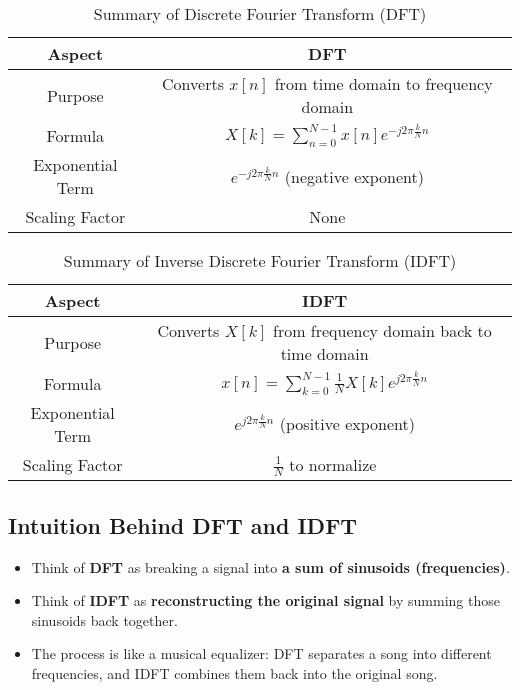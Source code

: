 \documentclass[12pt, letterpaper]{article}
\begin{document}
\begin{table}[h]
    \centering
    \begin{tabular}{|c|c|}
        \hline
        \textbf{Aspect} & \textbf{DFT} \\
        \hline
        Purpose & Converts \( x[n] \) from time domain to frequency domain \\
        \hline
        Formula & \( X[k] = \sum_{n=0}^{N-1} x[n] e^{-j 2\pi \frac{k}{N} n} \) \\
        \hline
        Exponential Term & \( e^{-j 2\pi \frac{k}{N} n} \) (negative exponent) \\
        \hline
        Scaling Factor & None \\
        \hline
    \end{tabular}
    \caption{Summary of Discrete Fourier Transform (DFT)}
\end{table}

\begin{table}[h]
    \centering
    \begin{tabular}{|c|c|}
        \hline
        \textbf{Aspect} & \textbf{IDFT} \\
        \hline
        Purpose & Converts \( X[k] \) from frequency domain back to time domain \\
        \hline
        Formula & \( x[n] = \sum_{k=0}^{N-1} \frac{1}{N} X[k] e^{j 2\pi \frac{k}{N} n} \) \\
        \hline
        Exponential Term & \( e^{j 2\pi \frac{k}{N} n} \) (positive exponent) \\
        \hline
        Scaling Factor & \( \frac{1}{N} \) to normalize \\
        \hline
    \end{tabular}
    \caption{Summary of Inverse Discrete Fourier Transform (IDFT)}
\end{table}

\FloatBarrier
\subsection{Intuition Behind DFT and IDFT}
\begin{itemize}
    \item Think of \textbf{DFT} as breaking a signal into \textbf{a sum of sinusoids (frequencies)}.
    \item Think of \textbf{IDFT} as \textbf{reconstructing the original signal} by summing those sinusoids back together.
    \item The process is like a musical equalizer: DFT separates a song into different frequencies, and IDFT combines them back into the original song.
\end{itemize}
\end{document}
